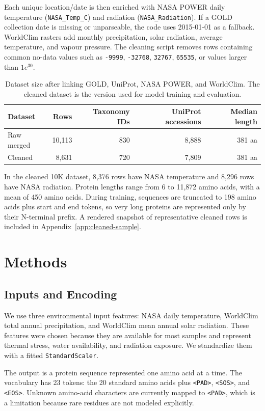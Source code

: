 \documentclass[11pt]{article}
\begin{document}
Each unique location/date is then enriched with NASA POWER daily temperature
(\texttt{NASA\_Temp\_C}) and radiation (\texttt{NASA\_Radiation}). If a GOLD
collection date is missing or unparseable, the code uses 2015-01-01 as a
fallback. WorldClim rasters add monthly precipitation, solar radiation, average
temperature, and vapour pressure. The cleaning script removes rows containing
common no-data values such as \texttt{-9999}, \texttt{-32768}, \texttt{32767},
\texttt{65535}, or values larger than \texttt{$1e^{30}$}.

\begin{table}[H]
\centering
\caption{Dataset size after linking GOLD, UniProt, NASA POWER, and WorldClim.
The cleaned dataset is the version used for model training and evaluation.}
\label{tab:data}
\begin{tabular}{lrrrr}
\toprule
Dataset & Rows & Taxonomy IDs & UniProt accessions & Median length \\
\midrule
Raw merged & 10,113 & 830 & 8,888 & 381 aa \\
Cleaned & 8,631 & 720 & 7,809 & 381 aa \\
\bottomrule
\end{tabular}
\end{table}

In the cleaned 10K dataset, 8,376 rows have NASA temperature and 8,296 rows
have NASA radiation. Protein lengths range from 6 to 11,872 amino acids, with a
mean of 450 amino acids. During training, sequences are truncated to 198 amino
acids plus start and end tokens, so very long proteins are represented only by
their N-terminal prefix. A rendered snapshot of representative cleaned rows is
included in Appendix~\ref{app:cleaned-sample}.

\section{Methods}
\subsection{Inputs and Encoding}
We use three environmental input features: NASA daily temperature, WorldClim
total annual precipitation, and WorldClim mean annual solar radiation. These
features were chosen because they are available for most samples and represent
thermal stress, water availability, and radiation exposure. We standardize them
with a fitted \texttt{StandardScaler}.

The output is a protein sequence represented one amino acid at a time. The
vocabulary has 23 tokens: the 20 standard amino acids plus \texttt{<PAD>},
\texttt{<SOS>}, and \texttt{<EOS>}. Unknown amino-acid characters are currently
mapped to \texttt{<PAD>}, which is a limitation because rare residues are not
modeled explicitly.
\end{document}
